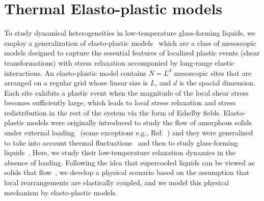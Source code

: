 \documentclass[pre,twocolumn,superscriptaddress,tightenlines,showpacs,longbibliography,floatfix,footinbib]{revtex4-1}
\begin{document}






 






\section{Thermal Elasto-plastic models}

To study dynamical heterogeneities in low-temperature glass-forming liquids, we employ a generalization of elasto-plastic models~\cite{picard2004elastic,Nicolas2018} which are a class of mesoscopic models designed to capture the essential features of localized plastic events (shear transformations) with stress relaxation accompanied by long-range elastic interactions. An elasto-plastic model contains $N=L^d$ mesoscopic sites that are arranged on a regular grid whose linear size is $L$, and $d$ is the spacial dimension. Each site exhibits a plastic event when the magnitude of the local shear stress becomes sufficiently large, which leads to local stress relaxation and stress redistribution in the rest of the system via the form of Eshelby fields. Elasto-plastic models were originally introduced to study the flow of amorphous solids under external loading~\cite{picard2004elastic,Lin2014b,Nicolas2018,rossi2022finite} (some exceptions e.g., Ref.~\cite{bulatov1994stochastic}) and they were generalized to take into account thermal fluctuations~\cite{ferrero2014relaxation} and then to study glass-forming liquids~\cite{ozawa2023elasticity}. Here, we study their low-temperature relaxation dynamics in the absence of loading. Following the idea that  supercooled liquids can be viewed as solids that flow~\cite{dyre2006colloquium,Lemaitre14}, we develop a physical scenario based on the assumption that local rearrangements are elastically 
coupled, and we model this physical mechanism by elasto-plastic models.
\end{document}
